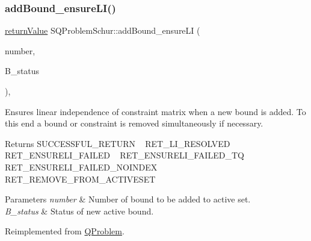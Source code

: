 \subsubsection{\texorpdfstring{add\+Bound\+\_\+ensure\+L\+I()}{addBound\_ensureLI()}}
{\footnotesize\ttfamily \hyperlink{_message_handling_8hpp_a81d556f613bfbabd0b1f9488c0fa865e}{return\+Value} S\+Q\+Problem\+Schur\+::add\+Bound\+\_\+ensure\+LI (\begin{DoxyParamCaption}\item[{\hyperlink{_types_8hpp_ab6fd6105e64ed14a0c9281326f05e623}{int\+\_\+t}}]{number,  }\item[{\hyperlink{_types_8hpp_a70a6a40d261a015ead8d43aa589383a4}{Subject\+To\+Status}}]{B\+\_\+status }\end{DoxyParamCaption})\hspace{0.3cm}{\ttfamily [protected]}, {\ttfamily [virtual]}}

Ensures linear independence of constraint matrix when a new bound is added. To this end a bound or constraint is removed simultaneously if necessary. \begin{DoxyReturn}{Returns}
S\+U\+C\+C\+E\+S\+S\+F\+U\+L\+\_\+\+R\+E\+T\+U\+RN ~\newline
 R\+E\+T\+\_\+\+L\+I\+\_\+\+R\+E\+S\+O\+L\+V\+ED ~\newline
 R\+E\+T\+\_\+\+E\+N\+S\+U\+R\+E\+L\+I\+\_\+\+F\+A\+I\+L\+ED ~\newline
 R\+E\+T\+\_\+\+E\+N\+S\+U\+R\+E\+L\+I\+\_\+\+F\+A\+I\+L\+E\+D\+\_\+\+TQ ~\newline
 R\+E\+T\+\_\+\+E\+N\+S\+U\+R\+E\+L\+I\+\_\+\+F\+A\+I\+L\+E\+D\+\_\+\+N\+O\+I\+N\+D\+EX ~\newline
 R\+E\+T\+\_\+\+R\+E\+M\+O\+V\+E\+\_\+\+F\+R\+O\+M\+\_\+\+A\+C\+T\+I\+V\+E\+S\+ET 
\end{DoxyReturn}

\begin{DoxyParams}{Parameters}
{\em number} & Number of bound to be added to active set. \\
\hline
{\em B\+\_\+status} & Status of new active bound. \\
\hline
\end{DoxyParams}


Reimplemented from \hyperlink{class_q_problem_a5b2284588df5e8d4b8c8d619d8d26c47}{Q\+Problem}.

\mbox{\label{class_s_q_problem_schur_aa40b7dd26d8f458c6b9fc038dcb42780}} 
